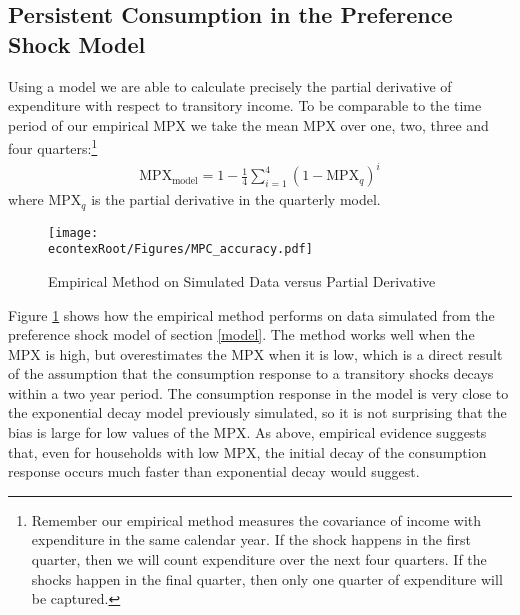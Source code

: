 \documentclass[titlepage]{\econtex}\newcommand{\texname}{ConsumptionHeterogeneity}
\begin{document}
\subsection{Persistent Consumption in the Preference Shock Model}
Using a model we are able to calculate precisely the partial derivative of expenditure with respect to transitory income. To be comparable to the time period of our empirical MPX we take the mean MPX over one, two, three and four quarters:\footnote{Remember our empirical method measures the covariance of income with expenditure in the same calendar year. If the shock happens in the first quarter, then we will count expenditure over the next four quarters. If the shocks happen in the final quarter, then only one quarter of expenditure will be captured.}
\begin{align*}
\text{MPX}_{\text{model}} = 1 - \frac{1}{4}\sum_{i=1}^{4}(1-\text{MPX}_q)^i 
\end{align*}
where $\text{MPX}_q$ is the partial derivative in the quarterly model.
\begin{figure} 
	\begin{centering}
		\texttt{[image: \\econtexRoot/Figures/MPC\_accuracy.pdf]}
		\caption{Empirical Method on Simulated Data versus Partial Derivative}
		\label{fig:MPC_accuracy}
	\end{centering}
\end{figure}

Figure \ref{fig:MPC_accuracy} shows how the empirical method performs on data simulated from the preference shock model of section \ref{model}. The method works well when the MPX is high, but overestimates the MPX when it is low, which is a direct result of the assumption that the consumption response to a transitory shocks decays within a two year period. The consumption response in the model is very close to the exponential decay model previously simulated, so it is not surprising that the bias is large for low values of the MPX. As above, empirical evidence suggests that, even for households with low MPX, the initial decay of the consumption response occurs much faster than exponential decay would suggest.
\end{document}
